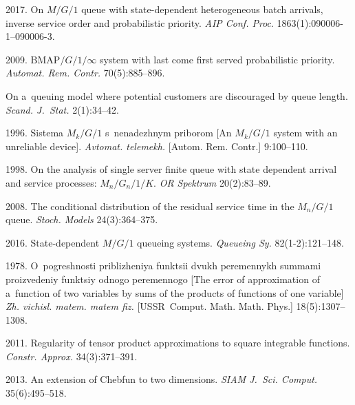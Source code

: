 \begin{multicols}{2}
{{\begin{thebibliography}{99}
 2017. On ${M/G/1}$ queue with state-dependent heterogeneous
 batch arrivals, inverse service order and probabilistic priority. 
 \textit{AIP Conf. Proc}. 1863(1):090006-1--090006-3.
 
 2009. 
${\mathrm{BMAP}/G/1/\infty}$ system with last come first served probabilistic priority.
\textit{Automat. Rem. \mbox{Contr.}} 70(5):885--896.

 On a~queuing model where potential customers are discouraged by queue length.
\textit{Scand. J.~Stat.} 2(1):34--42.

 1996. Sistema ${M_k/G/1}$ 
s~nenadezhnym priborom [An ${M_k/G/1}$  system with an unreliable device].
\textit{Avtomat. telemekh.} [Autom. Rem. Contr.] 9:100--110.



 1998.
On the analysis of single server finite queue with state dependent
arrival and service processes: ${M_n/G_n/1/K}$.
\textit{OR Spektrum} 20(2):83--89.

 2008. The conditional distribution of 
the residual service time in the ${M_n/G/1}$ queue.
\textit{Stoch. Models} 24(3):364--375.

 2016.
State-dependent ${M/G/1}$ queueing systems. 
\textit{Queueing Sy.} 82(1-2):121--148. 

 1978.
O~pogreshnosti priblizheniya funktsii dvukh peremennykh summami
proizvedeniy funktsiy odnogo peremennogo
[The error of approximation of a~function of two variables by sums 
of the products of functions of one variable]
\textit{Zh. vichisl. matem. matem fiz.}
[USSR\ Comput. Math. Math. Phys.] 18(5):1307--1308.

 2011. Regularity of tensor product approximations to square
integrable functions.
\textit{Constr. Approx.} 34(3):371--391.

 2013. 
An extension of Chebfun to two dimensions.
\textit{SIAM J.~Sci. Comput.} 35(6):495--518.


\end{thebibliography}

 }
 }

\end{multicols}

